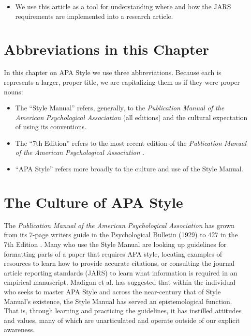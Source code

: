 \documentclass[
  11pt,
]{book}
\providecommand{\tightlist}{%
  \setlength{\itemsep}{0pt}\setlength{\parskip}{0pt}}
\begin{document}
\begin{itemize}
  \begin{itemize}
  \tightlist
  \item
    We use this article as a tool for understanding where and how the JARS requirements are implemented into a research article.
  \end{itemize}
\end{itemize}

\hypertarget{abbreviations-in-this-chapter}{%
\section{Abbreviations in this Chapter}\label{abbreviations-in-this-chapter}}

In this chapter on APA Style we use three abbreviations. Because each is represents a larger, proper title, we are capitalizing them as if they were proper nouns:

\begin{itemize}
\tightlist
\item
  The ``Style Manual'' refers, generally, to the \emph{Publication Manual of the American Psychological Association} (all editions) and the cultural expectation of using its conventions.
\item
  The ``7th Edition'' refers to the most recent edition of the \emph{Publication Manual of the American Psychological Association} \citep{american_psychological_association_publication_2020}.
\item
  ``APA Style'' refers more broadly to the culture and use of the Style Manual.
\end{itemize}

\hypertarget{the-culture-of-apa-style}{%
\section{The Culture of APA Style}\label{the-culture-of-apa-style}}

The \emph{Publication Manual of the American Psychological Association} has grown from its 7-page writers guide in the Psychological Bulletin (1929) to 427 in the 7th Edition \citep{american_psychological_association_publication_2020}. Many who use the Style Manual are looking up guidelines for formatting parts of a paper that requires APA style, locating examples of resources to learn how to provide accurate citations, or consulting the journal article reporting standards (JARS) to learn what information is required in an empirical manuscript. Madigan et al. \citeyearpar{madigan_language_1995} has suggested that within the individual who seeks to master APA Style and across the near-century that of Style Manual's existence, the Style Manual has served an epistemological function. That is, through learning and practicing the guidelines, it has instilled attitudes and values, many of which are unarticulated and operate outside of our explicit awareness.
\end{document}
